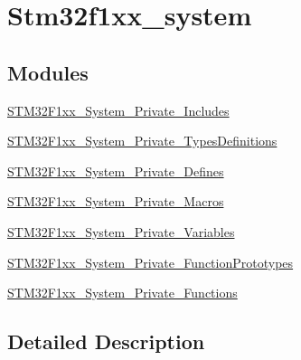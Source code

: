 \hypertarget{group__stm32f1xx__system}{}\section{Stm32f1xx\+\_\+system}
\label{group__stm32f1xx__system}
\subsection*{Modules}
\begin{DoxyCompactItemize}
\item 
\mbox{\hyperlink{group___s_t_m32_f1xx___system___private___includes}{S\+T\+M32\+F1xx\+\_\+\+System\+\_\+\+Private\+\_\+\+Includes}}
\item 
\mbox{\hyperlink{group___s_t_m32_f1xx___system___private___types_definitions}{S\+T\+M32\+F1xx\+\_\+\+System\+\_\+\+Private\+\_\+\+Types\+Definitions}}
\item 
\mbox{\hyperlink{group___s_t_m32_f1xx___system___private___defines}{S\+T\+M32\+F1xx\+\_\+\+System\+\_\+\+Private\+\_\+\+Defines}}
\item 
\mbox{\hyperlink{group___s_t_m32_f1xx___system___private___macros}{S\+T\+M32\+F1xx\+\_\+\+System\+\_\+\+Private\+\_\+\+Macros}}
\item 
\mbox{\hyperlink{group___s_t_m32_f1xx___system___private___variables}{S\+T\+M32\+F1xx\+\_\+\+System\+\_\+\+Private\+\_\+\+Variables}}
\item 
\mbox{\hyperlink{group___s_t_m32_f1xx___system___private___function_prototypes}{S\+T\+M32\+F1xx\+\_\+\+System\+\_\+\+Private\+\_\+\+Function\+Prototypes}}
\item 
\mbox{\hyperlink{group___s_t_m32_f1xx___system___private___functions}{S\+T\+M32\+F1xx\+\_\+\+System\+\_\+\+Private\+\_\+\+Functions}}
\end{DoxyCompactItemize}


\subsection{Detailed Description}

